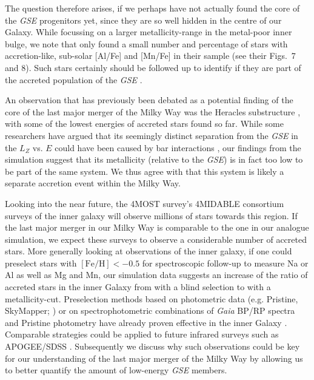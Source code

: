 \documentclass[fleqn,usenatbib]{mnras}
\begin{document}
The question therefore arises, if we perhaps have not actually found the core of the \textit{GSE} progenitors yet, since they are so well hidden in the centre of our Galaxy. While focussing on a larger metallicity-range in the metal-poor inner bulge, we note that \citet{Lucey2022} only found a small number and percentage of stars with accretion-like, sub-solar [Al/Fe] and [Mn/Fe] in their sample (see their Figs.~7 and 8). Such stars certainly should be followed up to identify if they are part of the accreted population of the \textit{GSE} \citep[see also][]{Kunder2025}.

An observation that has previously been debated as a potential finding of the core of the last major merger of the Milky Way was the Heracles substructure \citep{Horta2021}, with some of the lowest energies of accreted stars found so far. While some researchers have argued that its seemingly distinct separation from the \textit{GSE} in the $L_Z$ vs. $E$ could have been caused by bar interactions \citep{Dillamore2025}, our findings from the simulation suggest that its metallicity (relative to the \textit{GSE}) is in fact too low to be part of the same system. We thus agree with \citet{Horta2021} that this system is likely a separate accretion event within the Milky Way.

Looking into the near future, the 4MOST survey's 4MIDABLE consortium surveys of the inner galaxy \citep{4MOST_HR_DiskBulge, 4MOST_LR_DiskBulge} will observe millions of stars towards this region. If the last major merger in our Milky Way is comparable to the one in our analogue simulation, we expect these surveys to observe a considerable number of accreted stars. More generally looking at observations of the inner galaxy, if one could preselect stars with $\mathrm{[Fe/H]} < -0.5$ for spectroscopic follow-up to measure Na or Al as well as Mg and Mn, our simulation data suggests an increase of the ratio of accreted stars in the inner Galaxy from  with a blind selection to  with a metallicity-cut. Preselection methods based on photometric data (e.g. Pristine, SkyMapper; \citealt{Starkenburg2017, DaCosta2019}) or on spectrophotometric combinations of \textit{Gaia} BP/RP spectra and Pristine photometry \citep{Martin2024} have already proven effective in the inner Galaxy \citep[e.g. with the Pristine Inner Galaxy Survey;][]{Arentsen2020, Arentsen2020b}. Comparable strategies could be applied to future infrared surveys such as APOGEE/SDSS \citep{Santana2021}. Subsequently we discuss why such observations could be key for our understanding of the last major merger of the Milky Way by allowing us to better quantify the amount of low-energy \textit{GSE} members.
\end{document}

